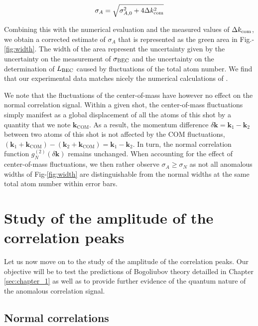 \begin{equation}
    \sigma_A = \sqrt{\sigma_{A,0}^2+4\Delta k_{\rm{com}}^2}
\end{equation}

\noindent Combining this with the numerical evaluation and the measured values of $\Delta k_{\rm{com}}$, we obtain a corrected estimate of $\sigma_A$ that is represented as the green area in Fig.-\ref{fig:width}. The width of the area represent the uncertainty given by the uncertainty on the measurement of $\sigma_{\rm{BEC}}$ and the uncertainty on the determination of $L_{\rm BEC}$ caused by fluctuations of the total atom number. We find that our experimental data matches nicely the numerical calculations of \cite{butera2020}.

We note that the fluctuations of the center-of-mass have however no effect on the normal correlation signal. Within a given shot, the center-of-mass fluctuations simply manifest as a global displacement of all the atoms of this shot by a quantity that we note $\bm{k}_{\mathrm{COM}}$. As a result, the momentum difference $\delta \bm{k} = \bm{k}_1 - \bm{k}_2$ between two atoms of this shot is not affected by the COM fluctuations, $(\bm{k}_1+\bm{k}_{\mathrm{COM}}) - (\bm{k}_2+\bm{k}_{\mathrm{COM}})=\bm{k}_1 - \bm{k}_2$. In turn, the normal correlation function $g^{(2)}_{N}(\delta \bm{k})$ remains unchanged. When accounting for the effect of center-of-mass fluctuations, we then rather observe $\sigma_A \geq \sigma_N$ as not all anomalous widths of Fig-\ref{fig:width} are distinguishable from the normal widths at the same total atom number within error bars.


\section{Study of the amplitude of the correlation peaks}

Let us now move on to the study of the amplitude of the correlation peaks. Our objective will be to test the predictions of Bogoliubov theory detailled in Chapter \ref{sec:chapter_1} as well as to provide further evidence of the quantum nature of the anomalous correlation signal.




\subsection{Normal correlations}

